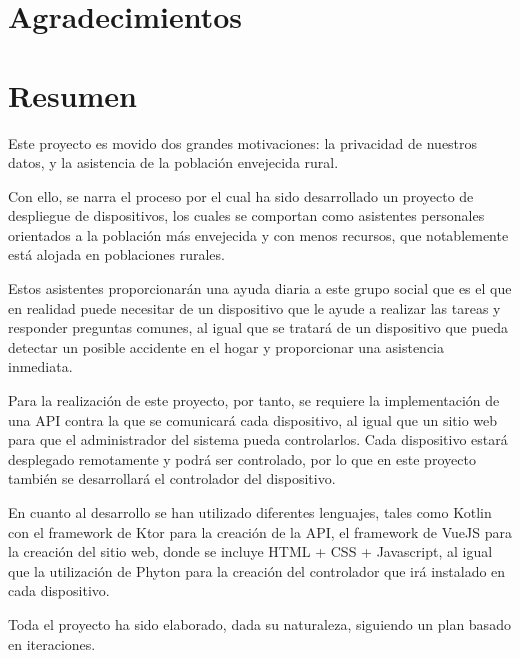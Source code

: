 \documentclass[openright,twoside,10pt]{book}
\begin{document}
\chapter*{Agradecimientos} %

\chapter*{Resumen} %
\begin{flushleft} %

Este proyecto es movido dos grandes motivaciones: la privacidad de nuestros datos, y la asistencia de la población envejecida rural.

Con ello, se narra el proceso por el cual ha sido desarrollado un proyecto de despliegue de dispositivos, los cuales se comportan como asistentes personales orientados a la población más envejecida y con menos recursos, que notablemente está alojada en poblaciones rurales.

Estos asistentes proporcionarán una ayuda diaria a este grupo social que es el que en realidad puede necesitar de un dispositivo que le ayude a realizar las tareas y responder preguntas comunes, al igual que se tratará de un dispositivo que pueda detectar un posible accidente en el hogar y proporcionar una asistencia inmediata.

Para la realización de este proyecto, por tanto, se requiere la implementación de una API contra la que se comunicará cada dispositivo, al igual que un sitio web para que el administrador del sistema pueda controlarlos. Cada dispositivo estará desplegado remotamente y podrá ser controlado, por lo que en este proyecto también se desarrollará el controlador del dispositivo.

En cuanto al desarrollo se han utilizado diferentes lenguajes, tales como Kotlin con el framework de Ktor para la creación de la API, el framework de VueJS para la creación del sitio web, donde se incluye HTML + CSS + Javascript, al igual que la utilización de Phyton para la creación del controlador que irá instalado en cada dispositivo.

Toda el proyecto ha sido elaborado, dada su naturaleza, siguiendo un plan basado en iteraciones.

\end{flushleft}
\end{document}
